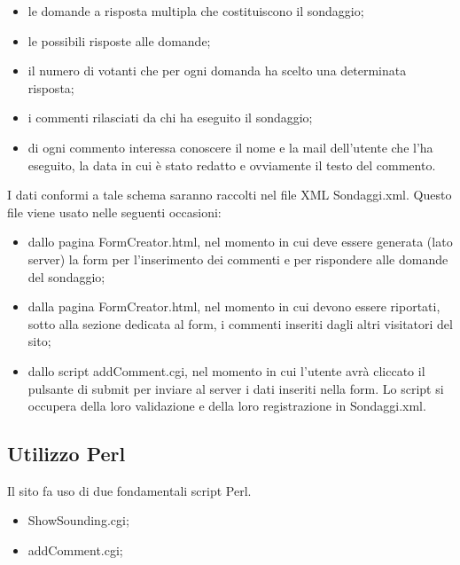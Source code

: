 \documentclass[10pt,a4paper,onecolumn]{article}
\begin{document}
\begin{itemize}
	\item le domande a risposta multipla che costituiscono il sondaggio;
	\item le possibili risposte alle domande;
	\item il numero di votanti che per ogni domanda ha scelto una determinata risposta;
	\item i commenti rilasciati da chi ha eseguito il sondaggio;
	\item di ogni commento interessa conoscere il nome e la mail dell'utente che l'ha eseguito, la data in cui è stato redatto e ovviamente il testo del commento.
\end{itemize}

I dati conformi a tale schema saranno raccolti nel file XML Sondaggi.xml. Questo file viene usato nelle seguenti occasioni:

\begin{itemize}
	\item dallo pagina FormCreator.html, nel momento in cui deve essere generata (lato server) la form per l'inserimento dei commenti e per rispondere alle domande del sondaggio;
	\item dalla pagina FormCreator.html, nel momento in cui devono essere riportati, sotto alla sezione dedicata al form, i commenti inseriti dagli altri visitatori del sito;
	\item dallo script addComment.cgi, nel momento in cui l'utente avrà cliccato il pulsante di submit per inviare al server i dati inseriti nella form. Lo script si occupera della loro validazione e della loro registrazione in Sondaggi.xml.
\end{itemize}

\subsection{Utilizzo Perl}
Il sito fa uso di due fondamentali script Perl.
\begin{itemize}
  \item ShowSounding.cgi;
  \item addComment.cgi;
\end{itemize}
\end{document}
